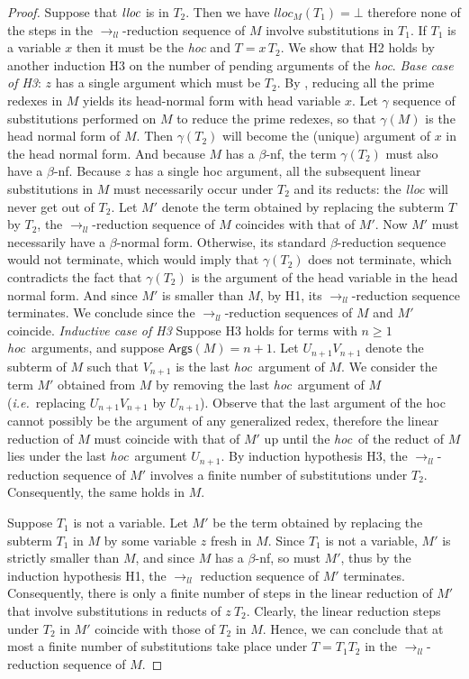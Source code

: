 \documentclass[xchauthor,chkrefs,GCNS,amsmath,amsthm,rotating,leaveRGB]{tcsg}
\theoremstyle{plain}
\theoremstyle{definition}
\newcommand{\llred}{\rightarrow_{ll}}
\newcommand{\hoc}{\emph{hoc}}
\begin{document}
\begin{proof}
Suppose that $\emph{lloc}$ is in $T_{2}$. Then we have $lloc_{M}(T_{1}) =\bot
$ therefore none of the steps in the $\llred $-reduction sequence of $M$
involve substitutions in $T_{1}$. If $T_{1}$ is a variable $x$ then it must
be the \emph{hoc} and $T = x\,T_{2}$. We show that H2 holds by another
induction H3 on the number of pending arguments of the \emph{hoc}. \emph{Base
case of H3}: $z$ has a single argument which must be $T_{2}$. By
, reducing all the prime
redexes in $M$ yields its head-normal form with head variable $x$. Let
$\gamma $  sequence of substitutions performed
on $M$ to reduce the prime redexes, so that $\gamma (M)$ is the head normal
form of $M$.  Then $\gamma (T_{2})$ will become the (unique) argument of $x$
in the head normal form. And because $M$ has a $\beta $-nf, the term $\gamma
(T_{2})$ must also have a $\beta $-nf. Because $z$ has a single hoc argument,
all the subsequent linear substitutions in $M$ must necessarily occur under
$T_{2}$ and its reducts: the \emph{lloc} will never get out of $T_{2}$. Let
$M'$ denote the term obtained by replacing the subterm $T$ by $T_{2}$, the
$\llred $-reduction sequence of $M$ coincides with that of $M'$. Now $M'$
must necessarily have a $\beta $-normal form. Otherwise, its standard $\beta
$-reduction sequence would not terminate, which would imply that $\gamma
(T_{2})$ does not terminate, which contradicts the fact that $\gamma (T_{2})$
is the argument of the head variable in the head normal form. And since $M'$
is smaller than $M$, by H1, its $\llred $-reduction sequence terminates. We
conclude since the $\llred $-reduction sequences of $M$ and $M'$ coincide.
\emph{Inductive case of H3} Suppose H3  holds for terms with $n \geq 1$ \hoc\
arguments, and suppose $\mathsf{Args}(M) = n+1$. Let $U_{n+1} V_{n+1}$ denote
the subterm of $M$ such that $V_{n+1}$ is the last \hoc\ argument of $M$. We
consider the term $M'$ obtained from $M$ by removing the last \hoc\ argument
of $M$ (\textit{i.e.}~replacing $U_{n+1} V_{n+1}$ by $U_{n+1}$). Observe that
the last argument of the hoc cannot possibly be the argument of any
generalized redex, therefore the linear reduction of $M$ must  coincide with
that of $M'$ up until the \hoc\ of the reduct of $M$ lies under the last
\hoc\ argument $U_{n+1}$. By induction hypothesis H3, the $\llred $-reduction
sequence of $M'$ involves a finite number of substitutions under $T_{2}$.
Consequently, the same holds in $M$.


Suppose $T_{1}$ is not a variable. Let $M'$ be the term obtained by replacing
the subterm $T_{1}$ in $M$ by some variable $z$ fresh in $M$. Since $T_{1}$
is not a variable, $M'$ is strictly smaller than $M$, and since $M$ has a
$\beta $-nf, so must $M'$, thus by the induction hypothesis H1, the $\llred $
reduction sequence of $M'$ terminates. Consequently, there is only a finite
number of steps in the linear reduction of $M'$ that involve substitutions in
reducts of $z~T_{2}$. Clearly, the linear reduction steps under $T_{2}$ in
$M'$ coincide with those of $T_{2}$ in $M$. Hence, we can conclude that at
most a finite number of substitutions take place under $T= T_{1} T_{2}$ in
the $\llred $-reduction sequence of $M$.



\end{proof}
\end{document}
